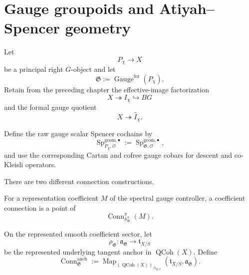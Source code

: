 \section{Gauge groupoids and Atiyah--Spencer geometry}
\label{sec:as-gauge}

Let
\[
    P_\chi\longrightarrow X
\]
be a principal right $G$-object and let
\[
    \mathfrak G
    :=
    \operatorname{Gauge}^{\mathrm{for}}(P_\chi).
\]
Retain from the preceding chapter the effective-image factorization
\[
    X\twoheadrightarrow I_\chi\hookrightarrow BG
\]
and the formal gauge quotient
\[
    X\twoheadrightarrow\widehat I_\chi.
\]

\begin{definition}
\label{def:as-gauge-spencer}
Define the raw gauge scalar Spencer cochains by
\[
    \operatorname{Sp}_{P_\chi,\mathcal O}^{\mathrm{geom},\bullet}
    :=
    \operatorname{Sp}_{\mathfrak G,\mathcal O}^{\mathrm{geom},\bullet},
\]
and use the corresponding Cartan and cofree gauge cobars for descent and
co-Kleisli operators.
\end{definition}

There are two different connection constructions.

\begin{definition}
\label{def:as-gauge-coefficient-connection}
For a representation coefficient $M$ of the spectral gauge controller, a
coefficient connection is a point of
\[
    \operatorname{Conn}_{\mathbb A_{\mathfrak G}^{\pi}}^\pi(M).
\]
\end{definition}

\begin{definition}
\label{def:as-anchor-splitting-connection}
On the represented smooth coefficient sector, let
\[
    \rho_{\mathfrak G}:
    \mathfrak a_{\mathfrak G}
    \longrightarrow
    \mathfrak t_{X/S}
\]
be the represented underlying tangent anchor in
$\operatorname{QCoh}(X)$.  Define
\[
\boxed{
    \operatorname{Conn}_{\mathfrak G}^{\mathrm{anch}}
    :=
    \operatorname{Map}_{(\operatorname{QCoh}(X))_{/\mathfrak t_{X/S}}}
    \left(
        \mathfrak t_{X/S},
        \mathfrak a_{\mathfrak G}
    \right).
}
\]
\end{definition}

